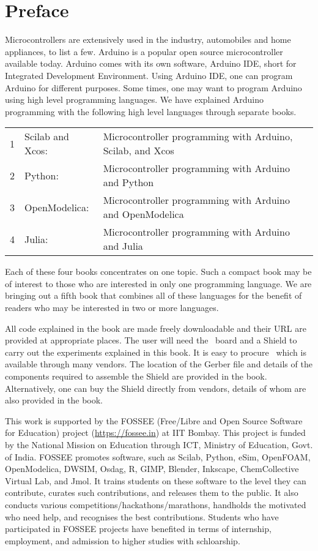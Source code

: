 \chapter*{Preface}
Microcontrollers are extensively used in the
industry, automobiles and home appliances, to list a few. 
Arduino is a popular open source microcontroller available today.
Arduino comes with its own software, Arduino IDE, short for Integrated
Development Environment.  Using Arduino IDE, one can program Arduino
for different purposes.  Some times, one may want to program Arduino
using high level programming languages.  We have explained Arduino
programming with the following high level languages through separate
books. 
\begin{center}
\begin{tabular}{llp{9cm}}
1 & Scilab and Xcos: & Microcontroller programming with Arduino,
Scilab, and Xcos \\
2 & Python: & Microcontroller programming with Arduino and Python \\
3 & OpenModelica: & Microcontroller programming with Arduino and
OpenModelica \\ 
4 & Julia: & Microcontroller programming with Arduino and Julia \\
\end{tabular}
\end{center}

Each of these four books concentrates on one topic.  Such a compact
book may be of interest to those who are interested in only one
programming language.  We are bringing out a fifth book that combines
all of these languages for the benefit of readers 
who may be interested in two or more languages.

All code explained in the book are made freely downloadable and their
URL are provided at appropriate places.  The user will need the
\arduino\ board and a Shield to carry out the experiments explained
in this book.  It is easy to procure \arduino\, which is available
through many vendors.  The location of the Gerber file and details of
the components required to assemble the Shield are provided in the
book.  Alternatively, one can buy the Shield directly from vendors,
details of whom are also provided in the book.

This work is supported by the FOSSEE (Free/Libre and Open Source
Software for Education) project (\url{https://fossee.in}) at IIT
Bombay.  This project is funded by the National Mission on Education
through ICT, Ministry of Education, Govt. of India.  FOSSEE promotes
software, such as Scilab, Python, eSim, OpenFOAM, OpenModelica, DWSIM,
Osdag, R, GIMP, Blender, Inkscape, ChemCollective Virtual Lab, and
Jmol.  It trains students on these software to the level they can
contribute, curates such contributions, and releases them to the
public.  It also conducts various competitions/hackathons/marathons,
handholds the motivated who need help, and recognises the best
contributions.  Students who have participated in FOSSEE projects have
benefited in terms of internship, employment, and admission to higher
studies with schloarship.


